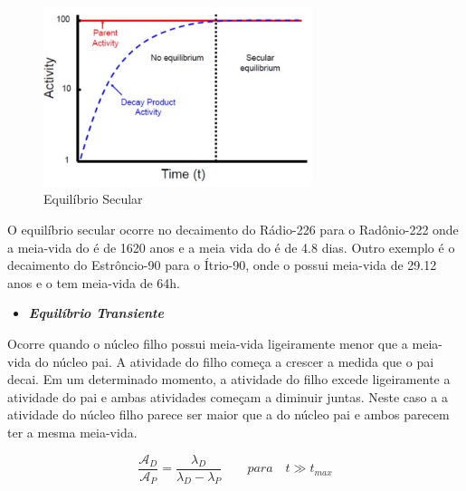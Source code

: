 \documentclass[11pt,a4paper]{article}
\newcounter{exemplo}
\begin{document}
                    \begin{figure}[h]
                        \centering
                        \includegraphics[width=0.7\textwidth]{Imagens/graficoEquilibrioSecular.jpg}
                        \caption{Equilíbrio Secular}
                        \label{fig:graficoEquilibrioSecular}
                    \end{figure}

    O equilíbrio secular ocorre no decaimento do Rádio-226 para o Radônio-222 onde a meia-vida do  é de 1620 anos e a meia vida do  é de 4.8 dias. Outro exemplo é o decaimento do Estrôncio-90 para o Ítrio-90, onde o  possui meia-vida de 29.12 anos e o  tem meia-vida de 64h.

                \begin{itemize}
                    \item \textbf{\textit{\textcolor{CarnationPink}{Equilíbrio Transiente}}}
                \end{itemize}

    Ocorre quando o núcleo filho possui meia-vida ligeiramente menor que a meia-vida do núcleo pai. A atividade do filho começa a crescer a medida que o pai decai. Em um determinado momento, a atividade do filho excede ligeiramente a atividade do pai e ambas atividades começam a diminuir juntas. Neste caso a  a atividade do núcleo filho parece ser maior que a do núcleo pai e ambos parecem ter a mesma meia-vida.
                    
                    \begin{equation}
                        \frac{\mathcal{A}_D}{\mathcal{A}_P} = \frac{\lambda_D}{\lambda_D - \lambda_P} \qquad para \quad t \gg t_{max}
                    \end{equation}
                
\end{document}
